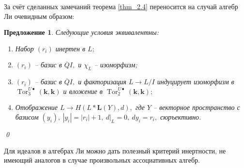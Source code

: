 \documentclass[10pt,a4paper]{article}
\DeclareMathOperator{\Tor}{Tor}
\def\L{\mathbf{L}}
\def\k{\mathbf{k}}
\newtheorem{prp}[thm]{Предложение}
\theoremstyle{definition}
\begin{document}
За счёт сделанных замечаний теорема \ref{thm_2.4} переносится на случай алгебр Ли очевидным образом:
\begin{prp}\label{prp_3.2} Следующие условия эквивалентны:
\begin{enumerate}
\item[(i)] Набор $(r_i)$ инертен в $L;$
\item[(ii)] $(r_i)$ -- базис в $\overline{Q}I,$ и $\chi_L$ -- изоморфизм;
\item[(iii)]$(r_i)$ -- базис в $\overline{Q}I,$ и факторизация $L\to L/I$ индуцирует изоморфизм в $\Tor_3^{U\bullet}(\k,\k)$ и вложение в $\Tor_2^{U\bullet}(\k,\k);$
\item[(iv)] Отображение $L\to H(L\ast \L(Y),d),$ где $Y$ -- векторное пространство с базисом $(y_i),~|y_i|=|r_i|+1,~d|_L=0,~dy_i=r_i,$ сюръективно.
\end{enumerate}
\qed\end{prp}
Для идеалов в алгебрах Ли можно дать полезный критерий инертности, не имеющий аналогов в случае произвольных ассоциативных алгебр.
\end{document}
